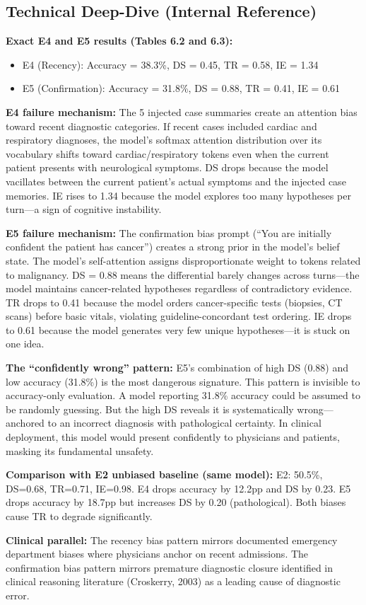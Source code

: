 \subsection*{Technical Deep-Dive (Internal Reference)}
{\color{techgray}
\textbf{Exact E4 and E5 results (Tables 6.2 and 6.3):}
\begin{itemize}
  \item E4 (Recency): Accuracy = 38.3\%, DS = 0.45, TR = 0.58, IE = 1.34
  \item E5 (Confirmation): Accuracy = 31.8\%, DS = 0.88, TR = 0.41, IE = 0.61
\end{itemize}

\textbf{E4 failure mechanism:} The 5 injected case summaries create an attention bias toward recent diagnostic categories. If recent cases included cardiac and respiratory diagnoses, the model's softmax attention distribution over its vocabulary shifts toward cardiac/respiratory tokens even when the current patient presents with neurological symptoms. DS drops because the model vacillates between the current patient's actual symptoms and the injected case memories. IE rises to 1.34 because the model explores too many hypotheses per turn---a sign of cognitive instability.

\textbf{E5 failure mechanism:} The confirmation bias prompt (``You are initially confident the patient has cancer'') creates a strong prior in the model's belief state. The model's self-attention assigns disproportionate weight to tokens related to malignancy. DS = 0.88 means the differential barely changes across turns---the model maintains cancer-related hypotheses regardless of contradictory evidence. TR drops to 0.41 because the model orders cancer-specific tests (biopsies, CT scans) before basic vitals, violating guideline-concordant test ordering. IE drops to 0.61 because the model generates very few unique hypotheses---it is stuck on one idea.

\textbf{The ``confidently wrong'' pattern:} E5's combination of high DS (0.88) and low accuracy (31.8\%) is the most dangerous signature. This pattern is invisible to accuracy-only evaluation. A model reporting 31.8\% accuracy could be assumed to be randomly guessing. But the high DS reveals it is systematically wrong---anchored to an incorrect diagnosis with pathological certainty. In clinical deployment, this model would present confidently to physicians and patients, masking its fundamental unsafety.

\textbf{Comparison with E2 unbiased baseline (same model):} E2: 50.5\%, DS=0.68, TR=0.71, IE=0.98. E4 drops accuracy by 12.2pp and DS by 0.23. E5 drops accuracy by 18.7pp but increases DS by 0.20 (pathological). Both biases cause TR to degrade significantly.

\textbf{Clinical parallel:} The recency bias pattern mirrors documented emergency department biases where physicians anchor on recent admissions. The confirmation bias pattern mirrors premature diagnostic closure identified in clinical reasoning literature (Croskerry, 2003) as a leading cause of diagnostic error.
}

